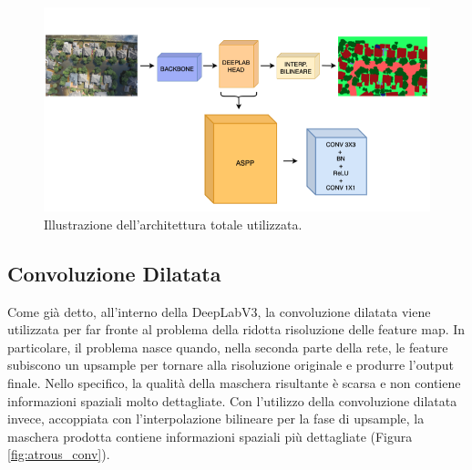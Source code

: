 \begin{figure}[h!]
    \centering
    \hspace*{-0in}
    \includegraphics[width=\textwidth]{img/architecture.png}
    \caption{Illustrazione dell'architettura totale utilizzata.}
    \label{fig:arch_totale}
\end{figure}












\subsection{Convoluzione Dilatata}
Come già detto, all'interno della DeepLabV3, la convoluzione dilatata viene utilizzata per far fronte al problema della ridotta risoluzione delle feature map. In particolare, il problema nasce quando, nella seconda parte della rete, le feature subiscono un upsample per tornare alla risoluzione originale e produrre l'output finale. Nello specifico, la qualità della maschera risultante è scarsa e non contiene informazioni spaziali molto dettagliate. Con l'utilizzo della convoluzione dilatata invece, accoppiata con l'interpolazione bilineare per la fase di upsample, la maschera prodotta contiene informazioni spaziali più dettagliate (Figura \ref{fig:atrous_conv}).

